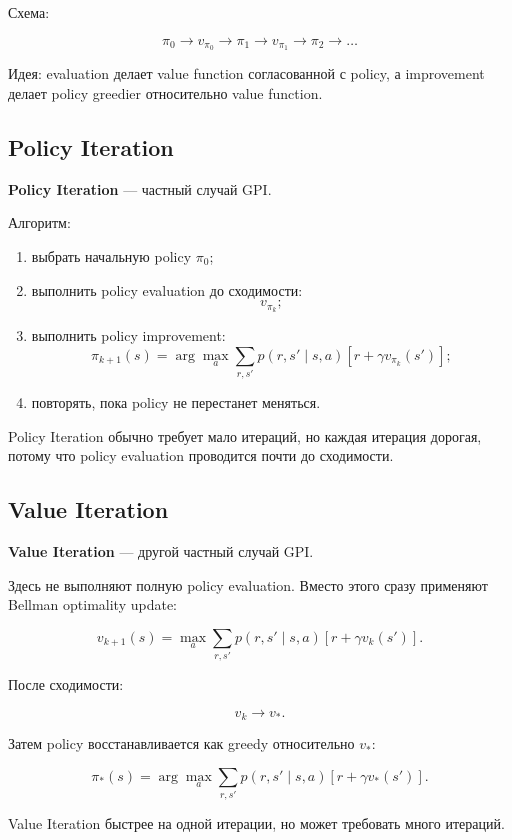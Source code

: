 \documentclass[a4paper,12pt]{article}
\begin{document}
Схема:

\[
\pi_0
\rightarrow
v_{\pi_0}
\rightarrow
\pi_1
\rightarrow
v_{\pi_1}
\rightarrow
\pi_2
\rightarrow
\dots
\]

Идея: evaluation делает value function согласованной с policy, а improvement делает policy greedier относительно value function.

\subsection{Policy Iteration}

\textbf{Policy Iteration} --- частный случай GPI.

Алгоритм:

\begin{enumerate}
    \item выбрать начальную policy \(\pi_0\);
    \item выполнить policy evaluation до сходимости:
    \[
    v_{\pi_k};
    \]
    \item выполнить policy improvement:
    \[
    \pi_{k+1}(s)
    =
    \arg\max_a
    \sum_{r,s'}
    p(r,s'\mid s,a)
    [
    r + \gamma v_{\pi_k}(s')
    ];
    \]
    \item повторять, пока policy не перестанет меняться.
\end{enumerate}

Policy Iteration обычно требует мало итераций, но каждая итерация дорогая, потому что policy evaluation проводится почти до сходимости.

\subsection{Value Iteration}

\textbf{Value Iteration} --- другой частный случай GPI.

Здесь не выполняют полную policy evaluation. Вместо этого сразу применяют Bellman optimality update:

\[
v_{k+1}(s)
=
\max_a
\sum_{r,s'}
p(r,s'\mid s,a)
\left[
r + \gamma v_k(s')
\right].
\]

После сходимости:

\[
v_k \rightarrow v_*.
\]

Затем policy восстанавливается как greedy относительно \(v_*\):

\[
\pi_*(s)
=
\arg\max_a
\sum_{r,s'}
p(r,s'\mid s,a)
\left[
r + \gamma v_*(s')
\right].
\]

Value Iteration быстрее на одной итерации, но может требовать много итераций.
\end{document}
